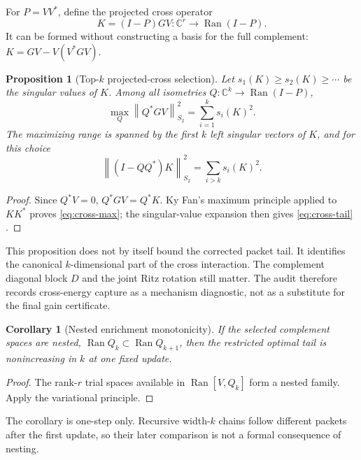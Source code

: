 \documentclass[11pt]{article}
\newtheorem{proposition}[theorem]{Proposition}
\newtheorem{corollary}[theorem]{Corollary}
\theoremstyle{definition}
\theoremstyle{remark}
\newcommand{\norm}[1]{\left\lVert#1\right\rVert}
\newcommand{\Ran}{\operatorname{Ran}}
\begin{document}
For $P=VV^*$, define the projected cross operator
\begin{equation}
 K=(I-P)GV:\mathbb C^r\longrightarrow\Ran(I-P).
 \label{eq:cross}
\end{equation}
It can be formed without constructing a basis for the full complement:
$K=GV-V(V^*GV)$.

\begin{proposition}[Top-$k$ projected-cross selection]
\label{prop:cross}
Let $s_1(K)\ge s_2(K)\ge\cdots$ be the singular values of $K$.  Among all
isometries $Q:\mathbb C^k\to\Ran(I-P)$,
\begin{equation}
 \max_Q\norm{Q^*GV}_{S_2}^2
 =\sum_{i=1}^k s_i(K)^2.
 \label{eq:cross-max}
\end{equation}
The maximizing range is spanned by the first $k$ left singular vectors of
$K$, and for this choice
\begin{equation}
 \norm{(I-QQ^*)K}_{S_2}^2=\sum_{i>k}s_i(K)^2.
 \label{eq:cross-tail}
\end{equation}
\end{proposition}

\begin{proof}
Since $Q^*V=0$, $Q^*GV=Q^*K$.  Ky Fan's maximum principle applied to
$KK^*$ proves \eqref{eq:cross-max}; the singular-value expansion then gives
\eqref{eq:cross-tail} \citep{GolubVanLoan2013}.
\end{proof}

This proposition does not by itself bound the corrected packet tail.  It
identifies the canonical $k$-dimensional part of the cross interaction.  The
complement diagonal block $D$ and the joint Ritz rotation still matter.  The
audit therefore records cross-energy capture as a mechanism diagnostic, not
as a substitute for the final gain certificate.

\begin{corollary}[Nested enrichment monotonicity]
\label{cor:nested}
If the selected complement spaces are nested,
$\Ran Q_k\subset\Ran Q_{k+1}$, then the restricted optimal tail is
nonincreasing in $k$ at one fixed update.
\end{corollary}

\begin{proof}
The rank-$r$ trial spaces available in $\Ran[V,Q_k]$ form a nested family.
Apply the variational principle.
\end{proof}

The corollary is one-step only.  Recursive width-$k$ chains follow different
packets after the first update, so their later comparison is not a formal
consequence of nesting.
\end{document}

